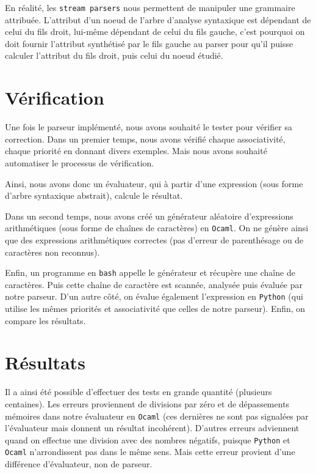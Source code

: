 \documentclass[11pt]{article}
\begin{document}
En réalité, les \texttt{stream parsers} nous permettent de manipuler une grammaire attribuée. L'attribut d'un noeud de l'arbre d'analyse syntaxique est dépendant de celui du fils droit, lui-même dépendant de celui du fils gauche, c'est pourquoi on doit fournir l'attribut synthétisé par le fils gauche au parser pour qu'il puisse calculer l'attribut du fils droit, puis celui du noeud étudié.

\section{Vérification}
Une fois le parseur implémenté, nous avons souhaité le tester pour vérifier sa correction.
Dans un premier temps, nous avons vérifié chaque associativité, chaque priorité en donnant divers exemples. Mais nous avons souhaité automatiser le processus de vérification.


Ainsi, nous avons donc un évaluateur, qui à partir d'une expression (sous forme d'arbre syntaxique abstrait), calcule le résultat.

Dans un second temps, nous avons créé un générateur aléatoire d'expressions arithmétiques (sous forme de chaînes de caractères) en \texttt{Ocaml}. On ne génère ainsi que des expressions arithmétiques correctes (pas d'erreur de parenthésage ou de caractères non reconnus).




Enfin, un programme en \texttt{bash} appelle le générateur et récupère une chaîne de caractères. Puis cette chaîne de caractère est scannée, analysée puis évaluée par notre parseur. D'un autre côté, on évalue également l'expression en \texttt{Python} (qui utilise les mêmes priorités et associativité que celles de notre parseur). Enfin, on compare les résultats.

\section{Résultats}

Il a ainsi été possible d'effectuer des tests en grande quantité (plusieurs centaines).
Les erreurs proviennent de divisions par zéro et de dépassements mémoires dans notre évaluateur en \texttt{Ocaml} (ces dernières ne sont pas signalées par l'évaluateur mais donnent un résultat incohérent). D'autres erreurs adviennent quand on effectue une division avec des nombres négatifs, puisque \texttt{Python} et \texttt{Ocaml} n'arrondissent pas dans le même sens. Mais cette erreur provient d'une différence d'évaluateur, non de parseur.
\end{document}
